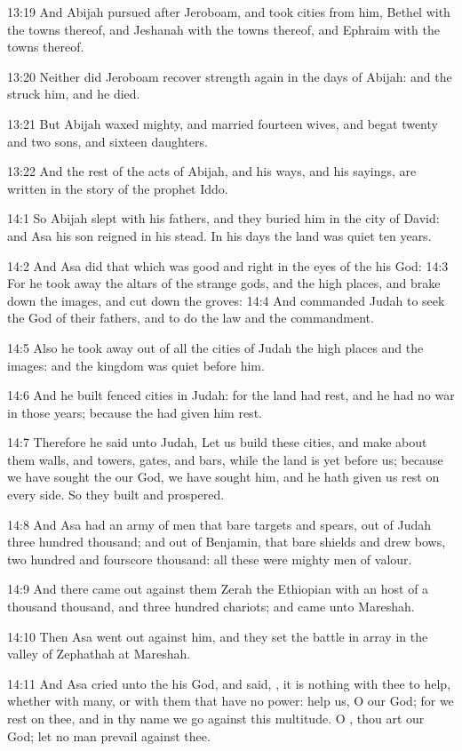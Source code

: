 13:19 And Abijah pursued after Jeroboam, and took cities from him, Bethel with the towns thereof, and Jeshanah with the towns thereof, and Ephraim with the towns thereof.

13:20 Neither did Jeroboam recover strength again in the days of Abijah: and the \LORD struck him, and he died.

13:21 But Abijah waxed mighty, and married fourteen wives, and begat twenty and two sons, and sixteen daughters.

13:22 And the rest of the acts of Abijah, and his ways, and his sayings, are written in the story of the prophet Iddo.

14:1 So Abijah slept with his fathers, and they buried him in the city of David: and Asa his son reigned in his stead. In his days the land was quiet ten years.

14:2 And Asa did that which was good and right in the eyes of the \LORD his God: 14:3 For he took away the altars of the strange gods, and the high places, and brake down the images, and cut down the groves: 14:4 And commanded Judah to seek the \LORD God of their fathers, and to do the law and the commandment.

14:5 Also he took away out of all the cities of Judah the high places and the images: and the kingdom was quiet before him.

14:6 And he built fenced cities in Judah: for the land had rest, and he had no war in those years; because the \LORD had given him rest.

14:7 Therefore he said unto Judah, Let us build these cities, and make about them walls, and towers, gates, and bars, while the land is yet before us; because we have sought the \LORD our God, we have sought him, and he hath given us rest on every side. So they built and prospered.

14:8 And Asa had an army of men that bare targets and spears, out of Judah three hundred thousand; and out of Benjamin, that bare shields and drew bows, two hundred and fourscore thousand: all these were mighty men of valour.

14:9 And there came out against them Zerah the Ethiopian with an host of a thousand thousand, and three hundred chariots; and came unto Mareshah.

14:10 Then Asa went out against him, and they set the battle in array in the valley of Zephathah at Mareshah.

14:11 And Asa cried unto the \LORD his God, and said, \LORD, it is nothing with thee to help, whether with many, or with them that have no power: help us, O \LORD our God; for we rest on thee, and in thy name we go against this multitude. O \LORD, thou art our God; let no man prevail against thee.

